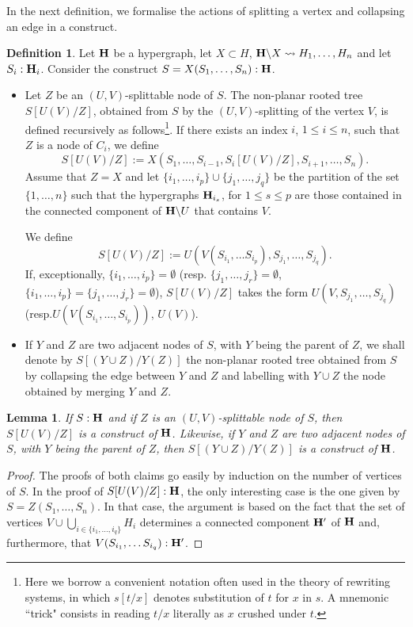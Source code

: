 \documentclass{article}
\theoremstyle{plain}
\newtheorem{lemma}[thm]{Lemma}
\theoremstyle{definition}
\newtheorem{definition}[thm]{Definition}
\newcommand{\hyper}[1]{{\bf #1}}
\begin{document}
 In the next definition, we formalise the 
actions of splitting
a vertex and collapsing an edge in a construct. 
\begin{definition}\label{basic_split}
Let ${\bf H}$ be a hypergraph, let $X\subset H$, ${\bf H}\backslash X\leadsto H_{1},\dots, H_{n}$ and let $S_i:{\bf H}_{i}$. 
Consider the construct $S=X(S_1,\dots,S_n):{\bf H}$.

\begin{itemize} 
\item[a)] Let
$Z$ be an $(U,V)$-splittable
 node of $S$. The non-planar rooted tree $S[U(V)/Z]$, obtained from $S$ by the $(U,V)$-splitting of the vertex $V$, is defined recursively as follows\footnote{Here we borrow a convenient notation often used in the theory of rewriting systems, in which $s[t/x]$ denotes substitution of $t$ for $x$ in $s$. A mnemonic ``trick" consists in reading $t/x$ literally as $x$ crushed under $t$.}. If there exists an index $i$, $1\leq i\leq n$, such
that $Z$ is a node of $C_i$, we define
$$S[U(V)/Z]:=X(S_1,\dots,S_{i-1},S_i[U(V)/Z],S_{i+1},\dots,S_n).$$ 
Assume that $Z=X$ and let
$\{i_1,\dots,i_p\}\cup \{j_1,\dots,j_q\}$ be the partition of the set
$\{1,\dots,n\}$ such that the hypergraphs ${\bf H}_{i_s}$, for
$1\leq s\leq p$ are those contained in the connected component of $\hyper{H}\backslash U$ that contains $V$.

We define
\begin{equation}S[U(V)/Z]:=U(V(S_{i_1},\dots
S_{i_p}),S_{j_1},\dots,S_{j_q}).\label{splitdef}\end{equation} If, exceptionally, 
$\{i_1,\dots,i_p\}=\emptyset$ (resp. $\{j_1,\dots,j_r\}=\emptyset$, $\{i_1,\dots,i_p\}=\{j_1,\dots,j_r\}=\emptyset$), $S[U(V)/Z]$ takes the form
 $U(V,S_{j_1},\dots,S_{j_q})$ (resp.\linebreak $U(V(S_{i_1},\dots,S_{i_p}))$, $U(V)$). 
\item[b)] If $Y$ and $Z$ are two adjacent nodes of $S$, with $Y$ being the parent of $Z$, we shall denote by $S[(Y\cup Z)/Y(Z)]$ the non-planar rooted tree obtained from $S$ by collapsing the edge between $Y$ and $Z$ and labelling with $Y\cup Z$ the node obtained by merging $Y$ and $Z$.
\end{itemize}
\end{definition}

 
\begin{lemma}\label{splitformally} If $S:{\bf H}$ and if $Z$ is an $(U,V)$-splittable
 node of $S$, then $S[U(V)/Z]$ is a construct of ${\bf H}$. Likewise, if $Y$ and $Z$ are two adjacent nodes of $S$, with $Y$ being the parent of $Z$, then $S[(Y\cup Z)/Y(Z)]$ is a construct of ${\bf H}$. 
\end{lemma}
\begin{proof}
The proofs of both claims go easily by induction on the number
of vertices of $S$. In the proof of $S[U(V)/Z]:{\bf H}$, the only interesting case is the one given by 
$S=Z(S_1,\dots,S_n)$. In that
case, the argument is based on the fact that the set of vertices
$V\cup \bigcup_{i\in \{i_1,\dots,i_q\}} {H}_i$
determines a connected component ${\bf H}'$ of ${\bf H}$ and,
furthermore, that $V(S_{i_1},\dots S_{i_q}):{\bf H}'$.
\end{proof}
\end{document}
